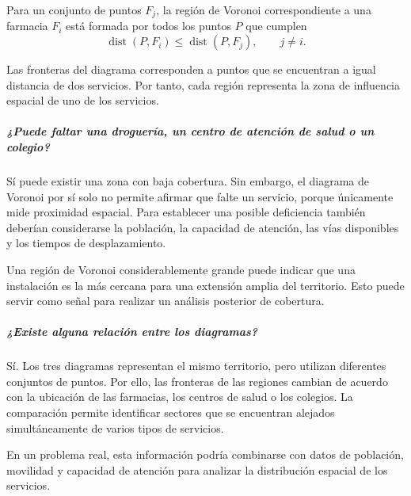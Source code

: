 \documentclass[14pt,twoside]{article}
\begin{document}
Para un conjunto de puntos $F_j$, la región de Voronoi correspondiente a una farmacia
$F_i$ está formada por todos los puntos $P$ que cumplen
\[
\operatorname{dist}(P,F_i)\leq\operatorname{dist}(P,F_j),
\qquad j\neq i.
\]

Las fronteras del diagrama corresponden a puntos que se encuentran a igual distancia
de dos servicios. Por tanto, cada región representa la zona de influencia espacial de
uno de los servicios.

\subparagraph{¿Puede faltar una droguería, un centro de atención de salud o un colegio?}

Sí puede existir una zona con baja cobertura. Sin embargo, el diagrama de Voronoi por
sí solo no permite afirmar que falte un servicio, porque únicamente mide proximidad
espacial. Para establecer una posible deficiencia también deberían considerarse la
población, la capacidad de atención, las vías disponibles y los tiempos de desplazamiento.

Una región de Voronoi considerablemente grande puede indicar que una instalación es la
más cercana para una extensión amplia del territorio. Esto puede servir como señal para
realizar un análisis posterior de cobertura.

\subparagraph{¿Existe alguna relación entre los diagramas?}

Sí. Los tres diagramas representan el mismo territorio, pero utilizan diferentes
conjuntos de puntos. Por ello, las fronteras de las regiones cambian de acuerdo con la
ubicación de las farmacias, los centros de salud o los colegios. La comparación permite
identificar sectores que se encuentran alejados simultáneamente de varios tipos de
servicios.

En un problema real, esta información podría combinarse con datos de población,
movilidad y capacidad de atención para analizar la distribución espacial de los servicios.
\end{document}
